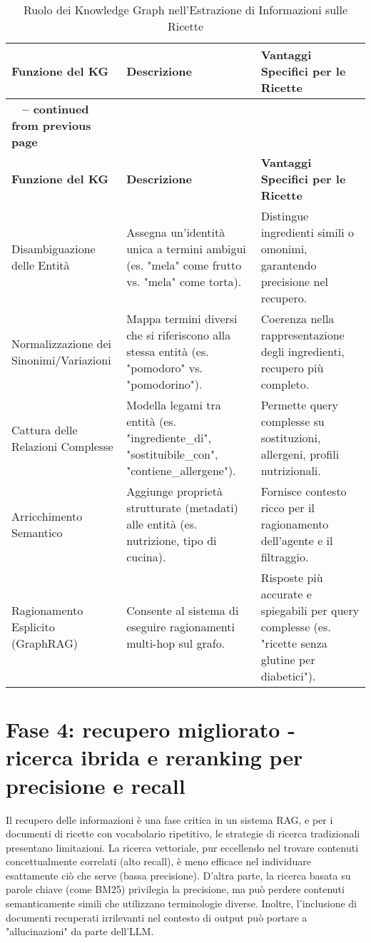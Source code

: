 \documentclass[a4paper, 11pt]{article}
\begin{document}
\begin{longtable}{>{\raggedright\arraybackslash}p{4cm} >{\raggedright\arraybackslash}p{6cm} >{\raggedright\arraybackslash}p{6cm}}
\caption{Ruolo dei Knowledge Graph nell'Estrazione di Informazioni sulle Ricette}\\
\toprule
\textbf{Funzione del KG} & \textbf{Descrizione} & \textbf{Vantaggi Specifici per le Ricette} \\
\midrule
\endfirsthead
\multicolumn{3}{c}%
{{\bfseries \tablename\ \thetable{} -- continued from previous page}} \\
\toprule
\textbf{Funzione del KG} & \textbf{Descrizione} & \textbf{Vantaggi Specifici per le Ricette} \\
\midrule
\endhead
\bottomrule
\endfoot
Disambiguazione delle Entità \cite{entity_linking_wiki} & Assegna un'identità unica a termini ambigui (es. "mela" come frutto vs. "mela" come torta). & Distingue ingredienti simili o omonimi, garantendo precisione nel recupero. \\
\addlinespace
Normalizzazione dei Sinonimi/Variazioni \cite{ingredient_substitutions_kg} & Mappa termini diversi che si riferiscono alla stessa entità (es. "pomodoro" vs. "pomodorino"). & Coerenza nella rappresentazione degli ingredienti, recupero più completo. \\
\addlinespace
Cattura delle Relazioni Complesse \cite{understanding_kg} & Modella legami tra entità (es. "ingrediente\_di", "sostituibile\_con", "contiene\_allergene"). & Permette query complesse su sostituzioni, allergeni, profili nutrizionali. \\
\addlinespace
Arricchimento Semantico \cite{understanding_kg} & Aggiunge proprietà strutturate (metadati) alle entità (es. nutrizione, tipo di cucina). & Fornisce contesto ricco per il ragionamento dell'agente e il filtraggio. \\
\addlinespace
Ragionamento Esplicito (GraphRAG) \cite{graphrag_explained} & Consente al sistema di eseguire ragionamenti multi-hop sul grafo. & Risposte più accurate e spiegabili per query complesse (es. "ricette senza glutine per diabetici"). \\
\end{longtable}

\section{Fase 4: recupero migliorato - ricerca ibrida e reranking per precisione e recall}
Il recupero delle informazioni è una fase critica in un sistema RAG, e per i documenti di ricette con vocabolario ripetitivo, le strategie di ricerca tradizionali presentano limitazioni. La ricerca vettoriale, pur eccellendo nel trovare contenuti concettualmente correlati (alto recall), è meno efficace nel individuare esattamente ciò che serve (bassa precisione). \cite{meilisearch_vector_dbs} D'altra parte, la ricerca basata su parole chiave (come BM25) privilegia la precisione, ma può perdere contenuti semanticamente simili che utilizzano terminologie diverse. \cite{hybrid_search_vectorchord} Inoltre, l'inclusione di documenti recuperati irrilevanti nel contesto di output può portare a "allucinazioni" da parte dell'LLM. \cite{mastering_rag_reranking}
\end{document}
